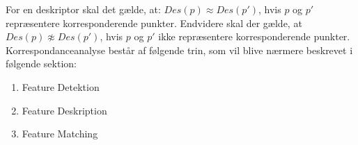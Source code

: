For en deskriptor skal det gælde, at: $Des(p)\approx Des(p')$, hvis $p$ og $p'$ repræsentere korresponderende punkter. Endvidere skal der gælde, at $Des(p)\not \approx Des(p')$, hvis $p$ og $p'$ ikke repræsentere korresponderende punkter. \\
Korrespondanceanalyse består af følgende trin, som vil blive nærmere beskrevet i følgende sektion:
\begin{enumerate}
\item{Feature Detektion}
\item{Feature Deskription}
\item{Feature Matching}
\end{enumerate}


